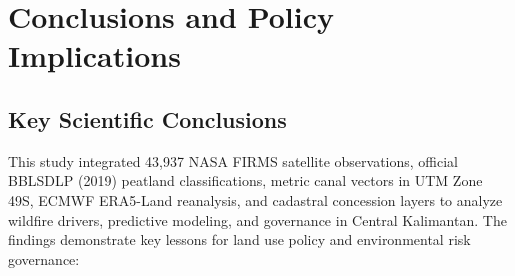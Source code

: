 \section{Conclusions and Policy Implications}
\label{sec:conclusions}

\subsection{Key Scientific Conclusions}
\label{subsec:concl_scientific}

This study integrated 43,937 NASA FIRMS satellite observations, official BBLSDLP (2019) peatland classifications, metric canal vectors in UTM Zone 49S, ECMWF ERA5-Land reanalysis, and cadastral concession layers to analyze wildfire drivers, predictive modeling, and governance in Central Kalimantan. The findings demonstrate key lessons for land use policy and environmental risk governance:
